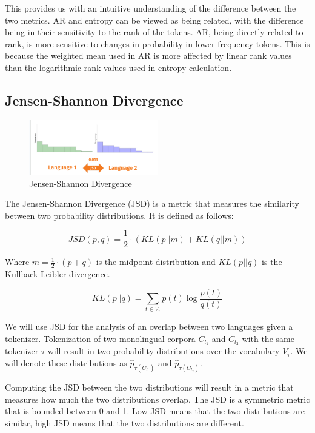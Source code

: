 This provides us with an intuitive understanding of the difference between the two metrics. AR and entropy can be viewed as being related, with the difference being in their sensitivity to the rank of the tokens. AR, being directly related to rank, is more sensitive to changes in probability in lower-frequency tokens. This is because the weighted mean used in AR is more affected by linear rank values than the logarithmic rank values used in entropy calculation.

\subsection{Jensen-Shannon Divergence}

\begin{figure}[h]
    \centering
    \includegraphics[width=0.5\textwidth]{img/temp/jsd_example.png}
    \caption{Jensen-Shannon Divergence}
    \label{fig:jsd_example}
\end{figure}

The Jensen-Shannon Divergence (JSD) is a metric that measures the similarity between two probability distributions. It is defined as follows:

\begin{equation}
    JSD(p, q) = \frac{1}{2} \cdot (KL(p||m) + KL(q||m))
\end{equation}

Where $m = \frac{1}{2} \cdot (p + q)$ is the midpoint distribution and $KL(p||q)$ is the Kullback-Leibler divergence. 

\begin{equation}
    KL(p||q) = \sum_{t \in V_\tau} p(t) \log \frac{p(t)}{q(t)}
\end{equation}

We will use JSD for the analysis of an overlap between two languages given a tokenizer. Tokenization of two monolingual corpora $C_{l_1}$ and $C_{l_2}$ with the same tokenizer $\tau$ will result in two probability distributions over the vocabulary $V_\tau$. We will denote these distributions as $\hat{p}_{\tau(C_{l_1})}$ and $\hat{p}_{\tau(C_{l_2})}$. 

Computing the JSD between the two distributions will result in a metric that measures how much the two distributions overlap. The JSD is a symmetric metric that is bounded between 0 and 1. Low JSD means that the two distributions are similar, high JSD means that the two distributions are different. 

